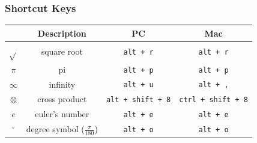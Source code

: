 \subsubsection{Shortcut Keys}
\begin{tabular}{@{}c | c |c | c }
	&\textbf{Description} & \textbf{PC }& \textbf{Mac} \\ \hline
	$ \sqrt{} $	& square root& \texttt{alt\,+\,r} &\texttt{alt\,+\,r} \\\hline
	$ \pi $	& pi& \texttt{alt\,+\,p} & \texttt{alt\,+\,p}\\\hline
	$ \infty $ &infinity& \texttt{alt\,+\,u} &\texttt{alt\,+\,,}  \\\hline
	$ \otimes $&cross product & \texttt{alt\,+\,shift\,+\,8}&\texttt{ctrl\,+\,shift\,+\,8} \\\hline
	$ e $&euler's number & \texttt{alt\,+\,e}& \texttt{alt\,+\,e}\\\hline
	$ {}^\circ $&degree symbol ($ \frac{\pi}{180} $) & \texttt{alt\,+\,o}& \texttt{alt\,+\,o}
	\\\hline	
\end{tabular}
\newpage


